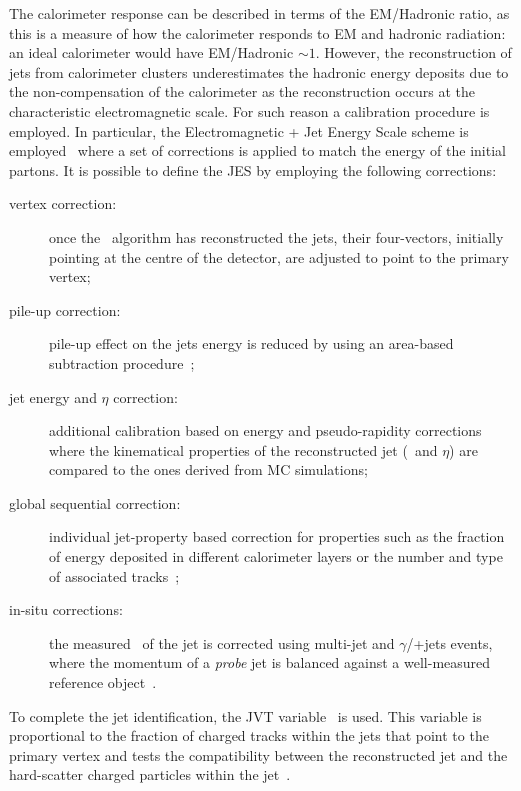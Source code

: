 			The calorimeter response can be described in terms of the \ac{EM}/Hadronic ratio, as this is a measure of how the calorimeter responds to \ac{EM} and hadronic radiation: an ideal calorimeter would have \ac{EM}/Hadronic $\sim1$. However, the reconstruction of jets from calorimeter clusters underestimates the hadronic energy deposits due to the non-compensation of the calorimeter as the reconstruction occurs at the characteristic electromagnetic scale. For such reason a calibration procedure is employed. In particular, the Electromagnetic + Jet Energy Scale scheme is employed~\cite{ATL-PHYS-PUB-2015-015} where a set of corrections is applied to match the energy of the initial partons. It is possible to define the \ac{JES} by employing the following corrections:

			\begin{description}
				\item[vertex correction:] once the \antikt\ algorithm has reconstructed the jets, their four-vectors, initially pointing at the centre of the detector, are adjusted to point to the primary vertex; 
				\item[pile-up correction:] pile-up effect on the jets energy is reduced by using an area-based subtraction procedure~\cite{TheATLAScollaboration:2013pia}; 
				\item[jet energy and $\eta$ correction:] additional calibration based on energy and pseudo-rapidity corrections where the kinematical properties of the reconstructed jet (\pt\ and $\eta$) are compared to the ones derived from \ac{MC} simulations; 
				\item[global sequential correction:] individual jet-property based correction for properties such as the fraction of energy deposited in different calorimeter layers or the number and type of associated tracks~\cite{ATLAS:2015oia}; 
				\item[in-situ corrections:] the measured \pt\ of the jet is corrected using multi-jet and $\gamma$/\Zboson+jets events, where the momentum of a \emph{probe} jet is balanced against a well-measured reference object~\cite{ATLAS-CONF-2015-017}.
			\end{description}

			To complete the jet identification, the \ac{JVT} variable~\cite{ATLAS-CONF-2014-018} is used. This variable is proportional to the fraction of charged tracks within the jets that point to the primary vertex and tests the compatibility between the reconstructed jet and the hard-scatter charged particles within the jet~\cite{Aaboud:2017pou}.


